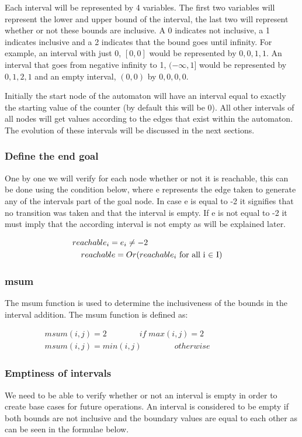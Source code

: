 \documentclass[12pt]{article}
\begin{document}
Each interval will be represented by 4 variables. The first two variables will represent the lower and upper bound of the interval, the last two will represent whether or not these bounds are inclusive. A 0 indicates not inclusive, a 1 indicates inclusive and a 2 indicates that the bound goes until infinity. For example, an interval with just 0, $[0, 0]$ would be represented by $0, 0, 1, 1$. An interval that goes from negative infinity to 1, $(-\infty, 1]$ would be represented by $0, 1, 2, 1$ and an empty interval, $(0, 0)$ by $0, 0, 0, 0$.

Initially the start node of the automaton will have an interval equal to exactly the starting value of the counter (by default this will be 0). All other intervals of all nodes will get values according to the edges that exist within the automaton. The evolution of these intervals will be discussed in the next sections.

\subsubsection{Define the end goal}
One by one we will verify for each node whether or not it is reachable, this can be done using the condition below, where e represents the edge taken to generate any of the intervals part of the goal node. In case e is equal to -2 it signifies that no transition was taken and that the interval is empty. If e is not equal to -2 it must imply that the according interval is not empty as will be explained later.

\begin{gather*}
	\hspace{-102 pt}reachable_i = e_i \ne -2 \\
	reachable = Or(reachable_i \text{ for all i $\in$ I})
\end{gather*}

\subsubsection{msum}
The msum function is used to determine the inclusiveness of the bounds in the interval addition. The msum function is defined as:

\begin{gather*}
msum(i, j) = 2 \qquad \qquad if \; max(i,j) = 2 \\
msum(i, j) = min(i, j) \quad \qquad \quad otherwise \qquad \qquad \qquad
\end{gather*}

\subsubsection{Emptiness of intervals}
We need to be able to verify whether or not an interval is empty in order to create base cases for future operations. An interval is considered to be empty if both bounds are not inclusive and the boundary values are equal to each other as can be seen in the formulae below. 
\end{document}
